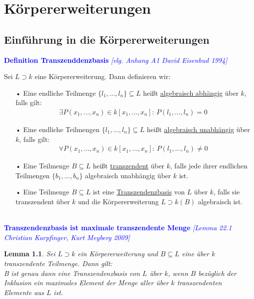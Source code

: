 \documentclass[10pt,a4paper]{report}
\newcommand{\comment}[1]{}
\newcommand{\ModulsOfDifferenzials}{David Eisenbud 1994}
\newcommand{\Algebra}{Christian Karpfinger, Kurt Meyberg 2009}
\newcounter{Aussage}[chapter]
\newtheorem{lemma}[Aussage]{Lemma}
\begin{document}
\chapter{Körpererweiterungen}
\section{Einführung in die Körpererweiterungen}
\textcolor{blue}{\textbf{Definition Transzenddenzbasis} \textit{[vlg. Anhang A1 \ModulsOfDifferenzials]}}
\begin{def}\comment{\label{Definition Transzenddenzbasis}}
Sei $L \supset k$ eine Körpererweiterung. Dann definieren wir:
\begin{itemize}
\item[•] Eine endliche Teilmenge $\lbrace l_1, \dots ,l_n \rbrace \subseteq L$ heißt \underline{algebraisch abhängig} über $k$, falls gilt:
\begin{gather*}
\exists P(x_1, \dots , x_n) \in k[x_1,\dots,x_n] : \, P(l_1, \dots , l_n) = 0
\end{gather*}
\item[•] Eine endliche Teilmengen $\lbrace l_1, \dots ,l_n \rbrace \subseteq L$ heißt \underline{algebraisch unabhängig} über $k$, falls gilt:
\begin{gather*}
\forall P(x_1, \dots , x_n) \in k[x_1,\dots,x_n] : \, P(l_1, \dots , l_n) \neq 0
\end{gather*}
\item[•] Eine Teilmenge $B \subseteq L$ heißt \underline{transzendent} über $k$, falls jede ihrer endlichen Teilmengen $\lbrace b_1, \dots , b_n \rbrace$ algebraisch unabhängig über $k$ ist.
\item[•] Eine Teilmenge $B \subseteq L$ ist eine \underline{Transzendenzbasis} von $L$ über $k$, falls sie transzendent über $k$ und die Körpererweiterung $L \supset k(B)$ algebraisch ist. 
\end{itemize}
\end{def}


\ \\
\textcolor{blue}{\textbf{Transzendenzbasis ist maximale transzendente Menge} \textit{[Lemma 22.1 \Algebra]}}
\begin{lemma}\label{Transzendenzbasis ist maximale transzendente Menge}
Sei $L \supset k$ ein Körpererweiterung und $B \subseteq L$ eine über $k$ transzendente Teilmenge. Dann gilt:\\
B ist genau dann eine Transzendenzbasis von $L$ über $k$, wenn $B$ bezüglich der Inklusion ein maximales Element der Menge aller über $k$ transzendenten Elemente aus $L$ ist.
\end{lemma}
\end{document}
